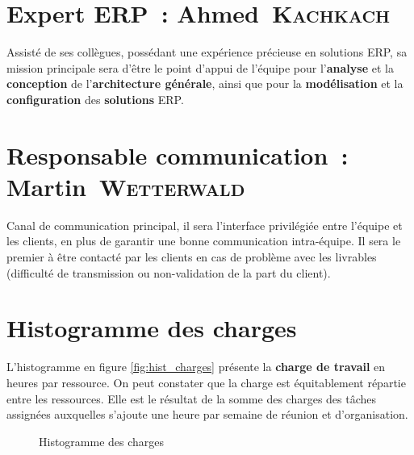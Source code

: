 \section{Expert ERP~: Ahmed~\textsc{Kachkach}}
Assisté de ses collègues, possédant une expérience précieuse en solutions ERP, sa mission principale sera d'être le point d'appui de l'équipe pour l'\textbf{analyse} et la \textbf{conception} de l'\textbf{architecture générale}, ainsi que pour la \textbf{modélisation} et la \textbf{configuration} des \textbf{solutions} ERP.

\section{Responsable communication~: Martin~\textsc{Wetterwald}}
Canal de communication principal, il sera l'interface privilégiée entre l'équipe et les clients, en plus de garantir une bonne communication intra-équipe. Il sera le premier à être contacté par les clients en cas de problème avec les livrables (difficulté de transmission ou non-validation de la part du client).

\section{Histogramme des charges}
L'histogramme en figure \vref{fig:hist_charges} présente la \textbf{charge de travail} en heures par ressource. On peut constater que la charge est équitablement répartie entre les ressources. Elle est le résultat de la somme des charges des tâches assignées auxquelles s'ajoute une heure par semaine de réunion et d'organisation.

\begin{figure}[h!]
	\caption{Histogramme des charges}
	\label{fig:hist_charges}
\end{figure}
